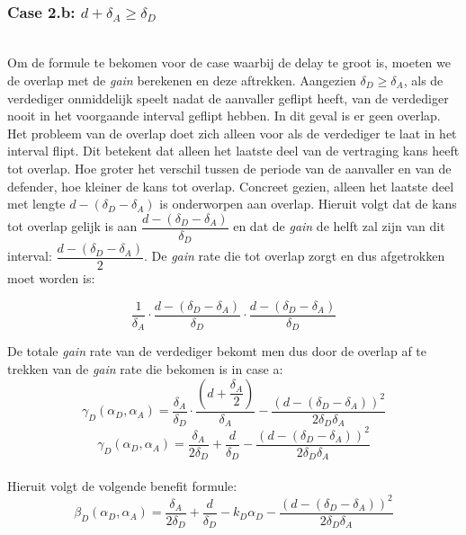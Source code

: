 \documentclass[master=cws, masteroption=vs,english]{kulemt}
\begin{document}
\begin{abstract*}
~~ \\
\subsubsection*{\textbf{Case 2.b:} $d + \delta_{A} \geq \delta_{D}$}
~~~\\

Om de formule te bekomen voor de case waarbij de delay te groot is, moeten we de overlap met de \textit{gain} berekenen en deze aftrekken. 
Aangezien $\delta_{D} \geq \delta_{A}$, als de verdediger onmiddelijk speelt nadat de aanvaller geflipt heeft, van de verdediger nooit in het voorgaande interval geflipt hebben. In dit geval is er geen overlap. Het probleem van de overlap doet zich alleen voor als de verdediger te laat in het interval flipt. Dit betekent dat alleen het laatste deel van de vertraging kans heeft tot overlap. Hoe groter het verschil tussen de periode van de aanvaller en van de defender, hoe kleiner de kans tot overlap. Concreet gezien, alleen het laatste deel met lengte $d - (\delta_{D} - \delta_{A})$ is onderworpen aan overlap. Hieruit volgt dat de kans tot overlap gelijk is aan $\dfrac{ d - (\delta_{D} - \delta_{A})}{\delta_{D}}$ en dat de \textit{gain} de helft zal zijn van dit interval: $\dfrac{ d - (\delta_{D} - \delta_{A})}{2}$.  De \textit{gain} rate die tot overlap zorgt en dus afgetrokken moet worden is:

\begin{equation}\label{first}
\dfrac{1} {\delta_{A}} \cdot \dfrac{d - (\delta_{D} - \delta_{A})}{\delta_{D}} \cdot \dfrac{d - (\delta_{D} - \delta_{A})}{\delta_{D}}
\end{equation}

De totale \textit{gain} rate van de verdediger bekomt men dus door de overlap af te trekken van de \textit{gain} rate die bekomen is in case a:
 \begin{equation}\label{first}
\gamma_{D}(\alpha_{D},\alpha_{A}) = \dfrac{\delta_{A}}{\delta_{D}} \cdot \dfrac{(d+\dfrac{\delta_{A}}{2})}{\delta_{A}} - \dfrac{(d - (\delta_{D} - \delta_{A}))^{2}}{2 \delta_{D} \delta_{A}}
\end{equation}
\begin{equation}\label{first}
\gamma_{D}(\alpha_{D},\alpha_{A}) = \dfrac{\delta_{A}}{2\delta_{D}} + \dfrac{d}{\delta_{D}} - \dfrac{(d - (\delta_{D} - \delta_{A}))^{2}}{2 \delta_{D} \delta_{A}}
\end{equation}\\
Hieruit volgt de volgende benefit formule:
\begin{equation}\label{first}
\beta_{D}(\alpha_{D},\alpha_{A}) = \dfrac{\delta_{A}}{2\delta_{D}} + \dfrac{d}{\delta_{D}} - k_{D} \alpha_{D} - \dfrac{(d - (\delta_{D} - \delta_{A}))^{2}}{2 \delta_{D} \delta_{A}}
\end{equation}\\
 

\end{abstract*}
\end{document}
